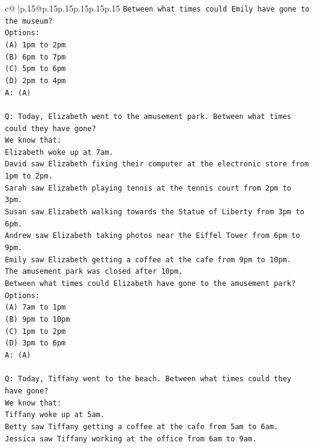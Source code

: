 \documentclass{article}
\begin{document}
{\begin{supertabular}{c@{$\;$}|p{.15\linewidth}@{}p{.15\linewidth}p{.15\linewidth}p{.15\linewidth}p{.15\linewidth}p{.15\linewidth}}
{{{\texttt{Between what times could Emily have gone to the museum?} \\
\texttt{Options:} \\
\texttt{(A) 1pm to 2pm} \\
\texttt{(B) 6pm to 7pm} \\
\texttt{(C) 5pm to 6pm} \\
\texttt{(D) 2pm to 4pm} \\
\texttt{A: (A)} \\
\\ 
\texttt{Q: Today, Elizabeth went to the amusement park. Between what times could they have gone?} \\
\texttt{We know that:} \\
\texttt{Elizabeth woke up at 7am.} \\
\texttt{David saw Elizabeth fixing their computer at the electronic store from 1pm to 2pm.} \\
\texttt{Sarah saw Elizabeth playing tennis at the tennis court from 2pm to 3pm.} \\
\texttt{Susan saw Elizabeth walking towards the Statue of Liberty from 3pm to 6pm.} \\
\texttt{Andrew saw Elizabeth taking photos near the Eiffel Tower from 6pm to 9pm.} \\
\texttt{Emily saw Elizabeth getting a coffee at the cafe from 9pm to 10pm.} \\
\texttt{The amusement park was closed after 10pm.} \\
\texttt{Between what times could Elizabeth have gone to the amusement park?} \\
\texttt{Options:} \\
\texttt{(A) 7am to 1pm} \\
\texttt{(B) 9pm to 10pm} \\
\texttt{(C) 1pm to 2pm} \\
\texttt{(D) 3pm to 6pm} \\
\texttt{A: (A)} \\
\\ 
\texttt{Q: Today, Tiffany went to the beach. Between what times could they have gone?} \\
\texttt{We know that:} \\
\texttt{Tiffany woke up at 5am.} \\
\texttt{Betty saw Tiffany getting a coffee at the cafe from 5am to 6am.} \\
\texttt{Jessica saw Tiffany working at the office from 6am to 9am.} \\
}}}
\end{supertabular}}
\end{document}
